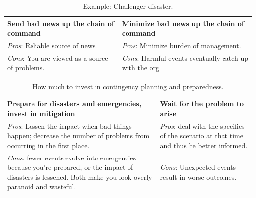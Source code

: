 \begin{center}
\begin{table}[ht]
\begin{tabular}{ | m{\dilemmatablewidth}| m{\dilemmatablewidth} | } 
  \hline
  \textbf{Send bad news up the chain of command} &
  \textbf{Minimize bad news up the chain of command} \\
  \hline
  \textit{Pros}: Reliable source of news. &
  \textit{Pros}: Minimize burden of management. \\
  \hline
  \textit{Cons}: You are viewed as a source of problems. & 
  \textit{Cons}: Harmful events eventually catch up with the org.  \\
  \hline
\end{tabular}
\caption{Example: Challenger disaster.}
\label{table:bad-news-up-the-chain}
\end{table}
\end{center}



\begin{center}
\begin{table}[ht]
\begin{tabular}{ | m{\dilemmatablewidth}| m{\dilemmatablewidth} | } 
  \hline
  \textbf{Prepare for disasters and emergencies, invest in mitigation} &
  \textbf{Wait for the problem to arise} \\
  \hline
  \textit{Pros}: Lessen the impact when bad things happen; decrease the number of problems from occurring in the first place. &
  \textit{Pros}: deal with the specifics of the scenario at that time and thus be better informed. \\
  \hline
  \textit{Cons}: fewer events evolve into emergencies because you're prepared, or the impact of disasters is lessened. Both make you look overly paranoid and wasteful. & 
  \textit{Cons}: Unexpected events result in worse outcomes.  \\
  \hline
\end{tabular}
\caption{How much to invest in contingency planning and preparedness.}
\label{table:emergencies-vs-ignore}
\end{table}
\end{center}

